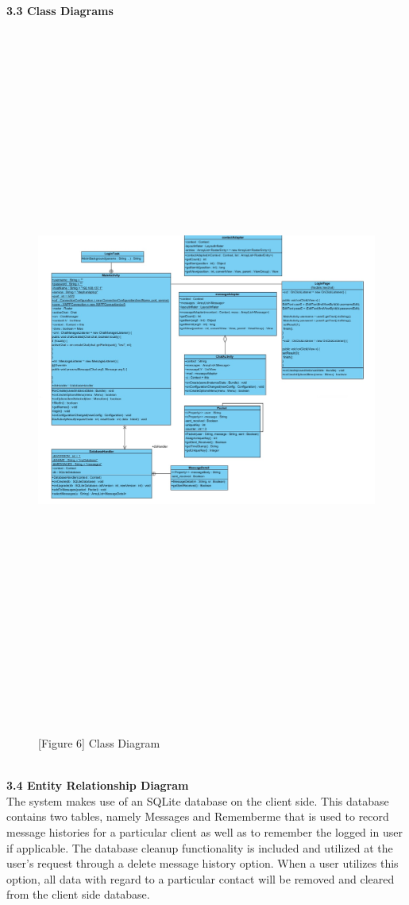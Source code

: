 \documentclass[29pt,a4paper]{moderncv}
\begin{document}
\newpage	
	\noindent \\ \left\textbf{3.3 Class Diagrams}\\
			\begin{figure}
				\centering
				\\ \includegraphics[width=7.0in, height=8.5in]{./Class_Diagram.jpg}
				\\\caption{[Figure 6] Class Diagram}\\
			\end{figure}
	
	\\ \noindent \textbf{3.4 Entity Relationship Diagram}
	\\The system makes use of an SQLite database on the client side. This database contains two tables, namely Messages and Rememberme that is used to record message histories for a particular client as well as to remember the logged in user if applicable. 
	\parindent 5mm The database cleanup functionality is included and utilized at the user’s request through a delete message history option. When a user utilizes this option, all data with regard to a particular contact will be removed and cleared from the client side database.
	\\ \\
	
\end{document}
